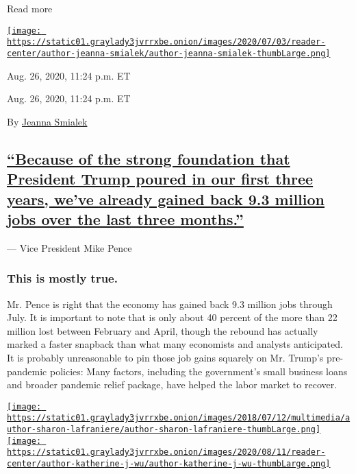 Read more

\href{https://www.nytimes3xbfgragh.onion/by/jeanna-smialek}{\texttt{[image: https://static01.graylady3jvrrxbe.onion/images/2020/07/03/reader-center/author-jeanna-smialek/author-jeanna-smialek-thumbLarge.png]}}

Aug. 26, 2020, 11:24 p.m. ET

Aug. 26, 2020, 11:24 p.m. ET

By \href{https://www.nytimes3xbfgragh.onion/by/jeanna-smialek}{Jeanna
Smialek}

\hypertarget{because-of-the-strong-foundation-that-president-trump-poured-in-our-first-three-years-weve-already-gained-back-93-million-jobs-over-the-last-three-months}{%
\subsection{\texorpdfstring{\protect\hyperlink{because-of-the-strong-foundation-that-president-trump-poured-in-our-first-three-years-weve-already-gained-back-9-3-million-jobs-}{``Because
of the strong foundation that President Trump poured in our first three
years, we've already gained back 9.3 million jobs over the last three
months.''}}{``Because of the strong foundation that President Trump poured in our first three years, we've already gained back 9.3 million jobs over the last three months.''}}\label{because-of-the-strong-foundation-that-president-trump-poured-in-our-first-three-years-weve-already-gained-back-93-million-jobs-over-the-last-three-months}}

--- Vice President Mike Pence

\hypertarget{this-is-mostly-true}{%
\subsubsection{This is mostly true.}\label{this-is-mostly-true}}

Mr. Pence is right that the economy has gained back 9.3 million jobs
through July. It is important to note that is only about 40 percent of
the more than 22 million lost between February and April, though the
rebound has actually marked a faster snapback than what many economists
and analysts anticipated. It is probably unreasonable to pin those job
gains squarely on Mr. Trump's pre-pandemic policies: Many factors,
including the government's small business loans and broader pandemic
relief package, have helped the labor market to recover.

\href{https://www.nytimes3xbfgragh.onion/by/sharon-lafraniere}{\texttt{[image: https://static01.graylady3jvrrxbe.onion/images/2018/07/12/multimedia/author-sharon-lafraniere/author-sharon-lafraniere-thumbLarge.png]}}\href{https://www.nytimes3xbfgragh.onion/by/katherine-j--wu}{\texttt{[image: https://static01.graylady3jvrrxbe.onion/images/2020/08/11/reader-center/author-katherine-j-wu/author-katherine-j-wu-thumbLarge.png]}}

